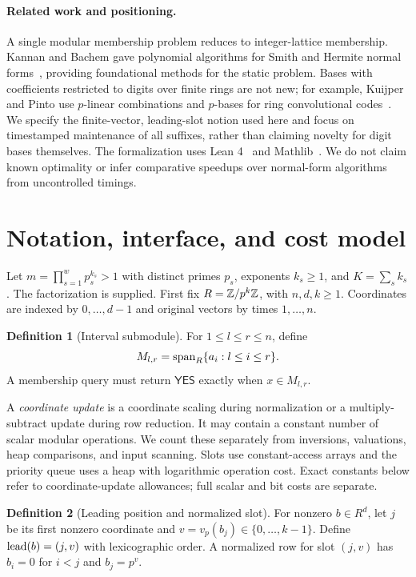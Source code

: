 \documentclass[11pt,a4paper]{article}
\theoremstyle{definition}
\newtheorem{definition}{Definition}
\theoremstyle{plain}
\begin{document}
\paragraph{Related work and positioning.}
A single modular membership problem reduces to integer-lattice membership. Kannan and Bachem gave
polynomial algorithms for Smith and Hermite normal forms~\cite{kannan1979}, providing foundational
methods for the static problem. Bases with coefficients restricted to digits over finite rings are
not new; for example, Kuijper and Pinto use $p$-linear combinations and $p$-bases for ring convolutional
codes~\cite{kuijper2009}. We specify the finite-vector, leading-slot notion used here and focus on
timestamped maintenance of all suffixes, rather than claiming novelty for digit bases themselves.
The formalization uses Lean 4~\cite{demoura2021} and Mathlib~\cite{mathlib2020}. We do not claim known
optimality or infer comparative speedups over normal-form algorithms from uncontrolled timings.

\section{Notation, interface, and cost model}
Let $m=\prod_{s=1}^w p_s^{k_s}>1$ with distinct primes $p_s$, exponents $k_s\ge1$, and
$K=\sum_s k_s$. The factorization is supplied. First fix $R=\mathbb Z/p^k\mathbb Z$, with $n,d,k\ge1$.
Coordinates are indexed by $0,\ldots,d-1$ and original vectors by times $1,\ldots,n$.

\begin{definition}[Interval submodule]\label{def:interval}
For $1\le l\le r\le n$, define
\[
 M_{l,r}=\operatorname{span}_R\{a_i:l\le i\le r\}.
\]
A membership query must return $\mathsf{YES}$ exactly when $x\in M_{l,r}$.
\end{definition}

A \emph{coordinate update} is a coordinate scaling during normalization or a multiply-subtract
update during row reduction. It may contain a constant number of scalar modular operations.
We count these separately from inversions, valuations, heap comparisons, and input scanning.
Slots use constant-access arrays and the priority queue uses a heap with logarithmic operation cost.
Exact constants below refer to coordinate-update allowances; full scalar and bit costs are separate.

\begin{definition}[Leading position and normalized slot]\label{def:lead}
For nonzero $b\in R^d$, let $j$ be its first nonzero coordinate and
$v=v_p(b_j)\in\{0,\ldots,k-1\}$. Define $\operatorname{lead}(b)=(j,v)$ with lexicographic order.
A normalized row for slot $(j,v)$ has $b_i=0$ for $i<j$ and $b_j=p^v$.
\end{definition}
\end{document}

